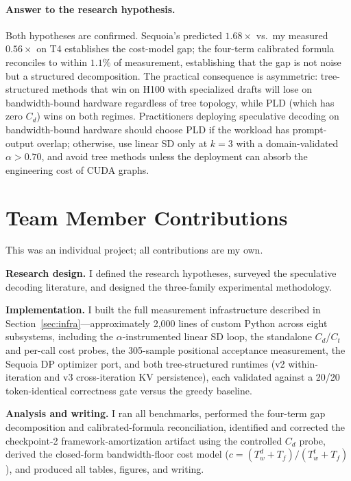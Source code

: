 \documentclass[letterpaper,twocolumn,10pt]{article}
\begin{document}
\paragraph{Answer to the research hypothesis.}
Both hypotheses are confirmed.
Sequoia's predicted $1.68\times$ vs.\ my measured $0.56\times$ on T4 establishes the cost-model gap; the four-term calibrated formula reconciles to within $1.1\%$ of measurement, establishing that the gap is not noise but a structured decomposition.
The practical consequence is asymmetric: tree-structured methods that win on H100 with specialized drafts will lose on bandwidth-bound hardware regardless of tree topology, while PLD (which has zero $C_d$) wins on both regimes.
Practitioners deploying speculative decoding on bandwidth-bound hardware should choose PLD if the workload has prompt-output overlap; otherwise, use linear SD only at $k = 3$ with a domain-validated $\alpha > 0.70$, and avoid tree methods unless the deployment can absorb the engineering cost of CUDA graphs.

\section*{Team Member Contributions}
This was an individual project; all contributions are my own.

\textbf{Research design.}
I defined the research hypotheses, surveyed the speculative decoding literature, and designed the three-family experimental methodology.

\textbf{Implementation.}
I built the full measurement infrastructure described in Section~\ref{sec:infra}---approximately 2,000 lines of custom Python across eight subsystems, including the $\alpha$-instrumented linear SD loop, the standalone $C_d$/$C_t$ and per-call cost probes, the 305-sample positional acceptance measurement, the Sequoia DP optimizer port, and both tree-structured runtimes (v2 within-iteration and v3 cross-iteration KV persistence), each validated against a 20/20 token-identical correctness gate versus the greedy baseline.

\textbf{Analysis and writing.}
I ran all benchmarks, performed the four-term gap decomposition and calibrated-formula reconciliation, identified and corrected the checkpoint-2 framework-amortization artifact using the controlled $C_d$ probe, derived the closed-form bandwidth-floor cost model ($c = (T_w^d + T_f)/(T_w^t + T_f)$), and produced all tables, figures, and writing.
\end{document}
